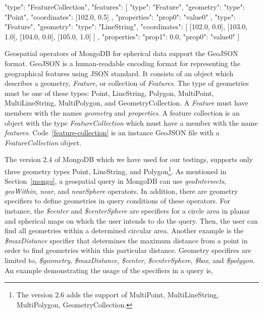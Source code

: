 \documentclass[a4paper,12pt]{article}
\begin{document}
\vspace{10px}
\begin{fakeXML}[label=feature-collection,caption=A GeoJSON file containing a \textit{FeatureCollection} object]
{
  "type": "FeatureCollection",
  "features": [
    {
      "type": "Feature",
      "geometry": {
        "type": "Point",
        "coordinates": [102.0, 0.5]
      },
      "properties": {
        "prop0": "value0"
      }
    },
    {
      "type": "Feature",
      "geometry": {
        "type": "LineString",
        "coordinates": [
          [102.0, 0.0], [103.0, 1.0], [104.0, 0.0], [105.0, 1.0]
        ]
      },
      "properties": {
        "prop1": 0.0,
        "prop0": "value0"
      }
    }
  ]
}
\end{fakeXML}
\vspace{10px}


Geospatial operators of MongoDB for spherical data support the GeoJSON~\cite{www/geojson} format. GeoJSON is a human-readable encoding format for representing the geographical features using JSON standard. It consists of an object which describes a geometry, \textit{Feature}, or collection of \textit{Features}. The type of geometries must be one of these types: Point, LineString, Polygon, MultiPoint, MultiLineString, MultiPolygon, and GeometryCollection. A \textit{Feature} must have members with the names \textit{geometry} and \textit{properties}. A feature collection is an object with the type \textit{FeatureCollection} which must have a member with the name \textit{features}. Code~\ref{feature-collection} is an instance GeoJSON file with a \textit{FeatureCollection} object.

The version $2.4$ of MongoDB which we have used for our testings, supports only three geometry types Point, LineString, and Polygon\footnote{The version $2.6$ adds the support of MultiPoint, MultiLineString, MultiPolygon, GeometryCollection.}. As mentioned in Section~\ref{mongo}, a geospatial query in MongoDB can use \textit{geoIntersects}, \textit{geoWithin}, \textit{near}, and \textit{nearSphere} operators. In addition, there are geometry specifiers to define geometries in query conditions of these operators. For instance, the \textit{\$center} and \textit{\$centerSphere} are specifiers for a circle area in planar and spherical maps on which the user intends to do the query. Then, the user can find all geometries within a determined circular area. Another example is the \textit{\$maxDistance} specifier that determines the maximum distance from a point in order to find geometries within this particular distance. Geometry specifires are limited to, \textit{\$geometry}, \textit{\$maxDistance}, \textit{\$center}, \textit{\$centerSphere}, \textit{\$box}, and \textit{\$polygon}. An example demonstrating the usage of the specifiers in a query is,
\vspace{10px}
 \vspace{10px}
 
\end{document}
